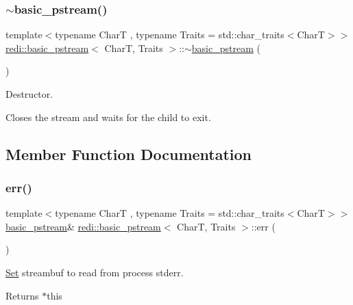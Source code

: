 \subsubsection{\texorpdfstring{$\sim$basic\+\_\+pstream()}{~basic\_pstream()}}
{\footnotesize\ttfamily template$<$typename CharT , typename Traits  = std\+::char\+\_\+traits$<$\+Char\+T$>$$>$ \\
\mbox{\hyperlink{classredi_1_1basic__pstream}{redi\+::basic\+\_\+pstream}}$<$ CharT, Traits $>$\+::$\sim$\mbox{\hyperlink{classredi_1_1basic__pstream}{basic\+\_\+pstream}} (\begin{DoxyParamCaption}{ }\end{DoxyParamCaption})\hspace{0.3cm}{\ttfamily [inline]}}



Destructor. 

Closes the stream and waits for the child to exit. 

\subsection{Member Function Documentation}
\mbox{\label{classredi_1_1basic__pstream_a63a8021d6fe3ca821f2f78520c194e3c}} 
\subsubsection{\texorpdfstring{err()}{err()}}
{\footnotesize\ttfamily template$<$typename CharT , typename Traits  = std\+::char\+\_\+traits$<$\+Char\+T$>$$>$ \\
\mbox{\hyperlink{classredi_1_1basic__pstream}{basic\+\_\+pstream}}\& \mbox{\hyperlink{classredi_1_1basic__pstream}{redi\+::basic\+\_\+pstream}}$<$ CharT, Traits $>$\+::err (\begin{DoxyParamCaption}{ }\end{DoxyParamCaption})\hspace{0.3cm}{\ttfamily [inline]}}



\mbox{\hyperlink{classSet}{Set}} streambuf to read from process\textquotesingle{} {\ttfamily stderr}. 

\begin{DoxyReturn}{Returns}
{\ttfamily $\ast$this} 
\end{DoxyReturn}
\mbox{\label{classredi_1_1basic__pstream_a110210bdb99afe12493e172b9017560c}} 

